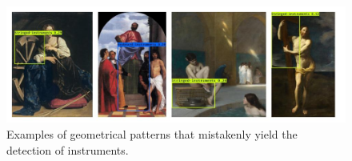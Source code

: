 \begin{figure}[ht!]
\centering
  \includegraphics[width=\linewidth]{./Images/Chapter05/false_positives_3}
  \caption{Examples of geometrical patterns that mistakenly yield the detection of instruments.}
  \label{fig:false_positives_3}
\end{figure}



